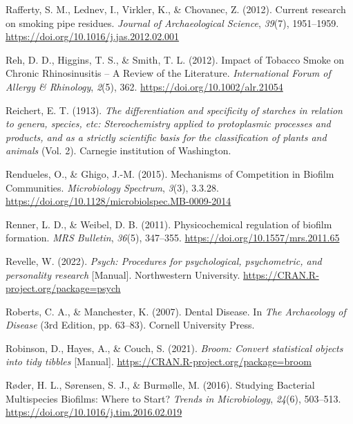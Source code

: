 \documentclass[
  letterpaper,
]{book}
\newlength{\cslhangindent}
\newlength{\cslentryspacingunit} %
\newenvironment{CSLReferences}[2] %
 {%
  \setlength{\parindent}{0pt}
  \ifodd #1
  \let\oldpar\par
  \def\par{\hangindent=\cslhangindent\oldpar}
  \fi
  \setlength{\parskip}{#2\cslentryspacingunit}
 }%
 {}
\begin{document}
\begin{CSLReferences}{1}{0}
\leavevmode{}%
Rafferty, S. M., Lednev, I., Virkler, K., \& Chovanec, Z. (2012).
Current research on smoking pipe residues. \emph{Journal of
Archaeological Science}, \emph{39}(7), 1951--1959.
\url{https://doi.org/10.1016/j.jas.2012.02.001}

\leavevmode{}%
Reh, D. D., Higgins, T. S., \& Smith, T. L. (2012). Impact of {Tobacco
Smoke} on {Chronic Rhinosinusitis} -- {A Review} of the {Literature}.
\emph{International Forum of Allergy \& Rhinology}, \emph{2}(5), 362.
\url{https://doi.org/10.1002/alr.21054}

\leavevmode{}%
Reichert, E. T. (1913). \emph{The differentiation and specificity of
starches in relation to genera, species, etc: Stereochemistry applied to
protoplasmic processes and products, and as a strictly scientific basis
for the classification of plants and animals} (Vol. 2). {Carnegie
institution of Washington}.

\leavevmode{}%
Rendueles, O., \& Ghigo, J.-M. (2015). Mechanisms of {Competition} in
{Biofilm Communities}. \emph{Microbiology Spectrum}, \emph{3}(3),
3.3.28. \url{https://doi.org/10.1128/microbiolspec.MB-0009-2014}

\leavevmode{}%
Renner, L. D., \& Weibel, D. B. (2011). Physicochemical regulation of
biofilm formation. \emph{MRS Bulletin}, \emph{36}(5), 347--355.
\url{https://doi.org/10.1557/mrs.2011.65}

\leavevmode{}%
Revelle, W. (2022). \emph{Psych: {Procedures} for psychological,
psychometric, and personality research} {[}Manual{]}. {Northwestern
University}. \url{https://CRAN.R-project.org/package=psych}

\leavevmode{}%
Roberts, C. A., \& Manchester, K. (2007). Dental {Disease}. In \emph{The
{Archaeology} of {Disease}} (3rd Edition, pp. 63--83). {Cornell
University Press}.

\leavevmode{}%
Robinson, D., Hayes, A., \& Couch, S. (2021). \emph{Broom: {Convert}
statistical objects into tidy tibbles} {[}Manual{]}.
\url{https://CRAN.R-project.org/package=broom}

\leavevmode{}%
Røder, H. L., Sørensen, S. J., \& Burmølle, M. (2016). Studying
{Bacterial Multispecies Biofilms}: {Where} to {Start}? \emph{Trends in
Microbiology}, \emph{24}(6), 503--513.
\url{https://doi.org/10.1016/j.tim.2016.02.019}


\end{CSLReferences}
\end{document}
